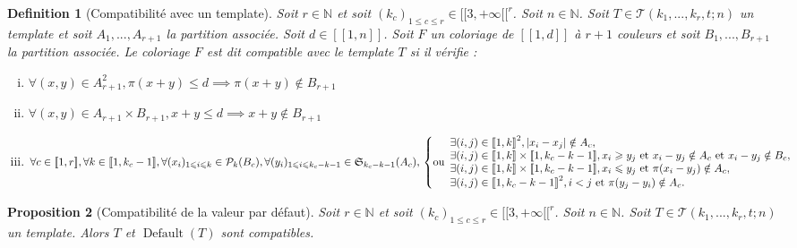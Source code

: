\documentclass{article}
\newtheorem{definition}{Definition}[section]
\newtheorem{proposition}[definition]{Proposition}
\DeclareMathOperator{\coldef}{Default}
\begin{document}
\begin{definition}[Compatibilité avec un template]
Soit \(r \in \mathbb{N}\) et soit \((k_c)_{1 \leqslant c \leqslant r}  \in {[\![3, +\infty[\![}^r\). Soit \(n \in \mathbb{N}\). Soit \(T \in \mathcal{T}(k_1, ..., k_r, t; n)\) un template et soit \(A_1, ..., A_{r+1}\) la partition associée. Soit \(d \in [\![1, n]\!]\). Soit \(F\) un coloriage de \([\![1, d]\!]\) à \(r +1\) couleurs et soit \(B_1, ..., B_{r+1}\) la partition associée. Le coloriage \(F\) est dit compatible avec le template \(T\) si il vérifie :
\begin{enumerate}[(i)]
\item \(\forall (x,y) \in A_{r+1}^2, \pi(x + y) \leqslant d \implies \pi(x + y)  \notin B_{r+1}\)
\item \(\forall (x,y) \in A_{r+1} \times B_{r+1}, x + y \leqslant d \implies x + y  \notin B_{r+1}\)
\item \(\forall c \in [\![1, r]\!], \forall k \in [\![1, k_c-1]\!], \forall (x_i)_{1 \leqslant i \leqslant k} \in\mathcal{P}_k(B_c), \forall (y_i)_{1 \leqslant i \leqslant k_c - k - 1} \in \mathfrak{S}_{k_c - k - 1}(A_c), \\
	\left\{ \text{ou} 
	\begin{array}{l}
		\exists (i, j) \in {[\![1, k]\!]}^2, |x_i - x_j| \notin A_c, \\
		\exists (i, j) \in [\![1, k]\!] \times [\![1, k_c - k - 1]\!], x_i \geqslant y_j  ~\text{et}~ x_i - y_j \notin A_c ~\text{et}~  x_i - y_j  \notin B_c, \\
		\exists (i, j) \in [\![1, k]\!] \times [\![1, k_c - k - 1]\!], x_i \leqslant y_j  ~\text{et}~ \pi(x_i - y_j) \notin A_c, \\
		\exists (i, j) \in {[\![1, k_c - k - 1]\!]}^2, i < j ~\text{et}~ \pi(y_j - y_i) \notin A_c.
	\end{array}
	\right.\)
\end{enumerate}
\end{definition}

\begin{proposition}[Compatibilité de la valeur par défaut]
Soit \(r \in \mathbb{N}\) et soit \((k_c)_{1 \leqslant c \leqslant r}  \in {[\![3, +\infty[\![}^r\). Soit \(n \in \mathbb{N}\). Soit \(T \in \mathcal{T}(k_1, ..., k_r, t; n)\) un template. Alors \(T\) et \(\coldef(T)\) sont compatibles.
\end{proposition}
\end{document}
